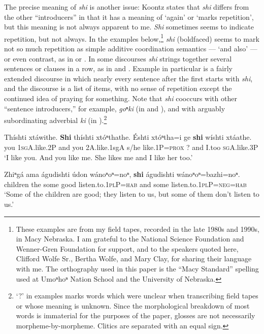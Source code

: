 \documentclass[output=paper]{LSP/langsci}
\begin{document}
The precise meaning of \textit{shi} is another issue:  Koontz states that \textit{shi} differs from the other ``introducers'' in that it has a meaning of `again' or `marks repetition', but this meaning is not always apparent to me. \textit{Shi} sometimes seems to indicate repetition, but not always.  In the examples below,\footnote{These examples are from my field tapes, recorded in the late 1980s and 1990s, in Macy Nebraska. I am grateful to the National Science Foundation and Wenner-Gren Foundation for support, and to the speakers quoted here, Clifford Wolfe Sr., Bertha Wolfe, and Mary Clay, for sharing their language with me. The orthography used in this paper is the ``Macy Standard'' spelling used at Umoⁿhoⁿ Nation School and the University of Nebraska.}   \textit{shi} (boldfaced) seems to mark not so much repetition as simple additive coordination semantics --- `and also' --- or even contrast, as in  or .  In some discourses \textit{shi} strings together several sentences or clauses in a row, as in  and .  Example  in particular is a fairly extended discourse in which nearly every sentence after the first starts with \textit{shi}, and the discourse is a list of items, with no sense of repetition except the continued idea of praying for something. Note that \textit{shi} cooccurs with other ``sentence introducers,'' for example, \textit{goⁿki} (in  and ), and with arguably subordinating adverbial \textit{ki} (in ).\footnote{`?' in examples marks words which were unclear when transcribing field tapes or whose meaning is unknown. Since the morphological breakdown of most words is immaterial for the purposes of the paper, glosses are not necessarily morpheme-by-morpheme. Clitics are separated with an equal sign.}

\ea
\gll Th\'ishti  xt\'awithe.  \textbf{Shi} th\'ishti xt\'oⁿthathe.  \'Eshti  xt\'oⁿtha=i  ge \textbf{shi}  w\'ishti xt\'aathe.\\
 	you   	\textsc{1sgA}.like.2P  and 	you     	2A.like.{1sgA}  	s/he   	like.1P=\textsc{prox}  	?  	and  	I.too  	\textsc{sgA}.like.3P\\
\trans `I like you.  And you like me.  She likes me and I like her too.'

\ex 
\gll  Zhiⁿg\'a  ama \'agudishti \'udon  w\'anoⁿoⁿ=noⁿ, \textbf{shi}  \'agudishti  w\'anoⁿoⁿ=bazhi=noⁿ.\\
children 	the 	some        	good  	listen.to.\textsc{1plP=hab} 	and some listen.to.\textsc{1plP}=\textsc{neg=hab}\\
\trans `Some of the children are good; they listen to us, but some of them don't listen to us.'
\end{document}
